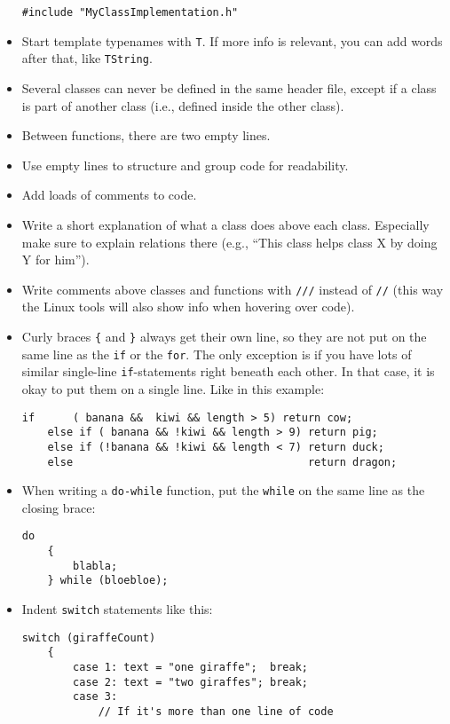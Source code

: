 \documentclass{article}
\begin{document}
\begin{itemize}
\begin{Verbatim}[fontsize=\small]
    #include "MyClassImplementation.h"
    \end{Verbatim}
    \item Start template typenames with \texttt{T}. If more info is relevant, you can add words after that, like \texttt{TString}.
    \item Several classes can never be defined in the same header file, except if a class is part of another class (i.e., defined inside the other class).
    \item Between functions, there are two empty lines.
    \item Use empty lines to structure and group code for readability.
    \item Add loads of comments to code.
    \item Write a short explanation of what a class does above each class. Especially make sure to explain relations there (e.g., “This class helps class X by doing Y for him”).
    \item Write comments above classes and functions with \texttt{///} instead of \texttt{//} (this way the Linux tools will also show info when hovering over code).
    \item Curly braces \texttt{\{} and \texttt{\}} always get their own line, so they are not put on the same line as the \texttt{if} or the \texttt{for}. The only exception is if you have lots of similar single-line \texttt{if}-statements right beneath each other. In that case, it is okay to put them on a single line. Like in this example:
    \begin{Verbatim}[fontsize=\small]
    if      ( banana &&  kiwi && length > 5) return cow;
    else if ( banana && !kiwi && length > 9) return pig;
    else if (!banana && !kiwi && length < 7) return duck;
    else                                     return dragon;
    \end{Verbatim}
    \item When writing a \texttt{do-while} function, put the \texttt{while} on the same line as the closing brace:
    \begin{Verbatim}[fontsize=\small]
    do
    {
        blabla;
    } while (bloebloe);
    \end{Verbatim}
    \item Indent \texttt{switch} statements like this:
    \begin{Verbatim}[fontsize=\small]
    switch (giraffeCount)
    {
        case 1: text = "one giraffe";  break;
        case 2: text = "two giraffes"; break;
        case 3:
            // If it's more than one line of code

\end{Verbatim}
\end{itemize}
\end{document}
